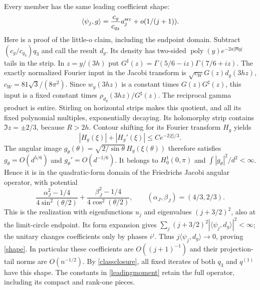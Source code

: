 Every member has the same leading coefficient shape:
\begin{equation}\label{shape}
 \langle\psi_j,g\rangle
   =\frac{c_g}{c_{q_3}}a_j^{\rm src}+o(1/(j+1)).
\end{equation}
Here is a proof of the little-o claim, including the endpoint domain.
Subtract $(c_g/c_{q_3})q_3$ and call the result $d_g$. Its density
has two-sided $\operatorname{poly}(y)e^{-2a|\Re y|}$ tails in the
strip. In $z=y/(3h)$ put
$G^\sharp(z)=\Gamma(5/6-iz)\Gamma(7/6+iz)$.
The exactly normalized Fourier input in the Jacobi transform is
$\sqrt{c_W}G(z)d_g(3hz)$, $c_W=81\sqrt3/(8\pi^2)$.
Since $w_y(3hz)$ is a constant times $G(z)G^\sharp(z)$, this input
is a fixed constant times $\rho_{d_g}(3hz)/G^\sharp(z)$.
The reciprocal gamma product is entire. Stirling on horizontal strips
makes this quotient, and all its fixed polynomial multiples, exponentially
decaying. Its holomorphy strip contains $\Im z=\pm2/3$, because
$R>2h$. Contour shifting for its Fourier transform $H_g$ yields
\[
 |H_g(\xi)|+|H_g'(\xi)|\le Ce^{-2|\xi|/3}.
\]
The angular image
$g_\theta(\theta)=\sqrt{2/\sin\theta}\,H_g(\xi(\theta))$
therefore satisfies
$g_\theta=O(d^{5/6})$ and $g_\theta'=O(d^{-1/6})$.
It belongs to $H_0^1(0,\pi)$ and
$\int |g_\theta|^2/d^2<\infty$. Hence it is in the quadratic-form
domain of the Friedrichs Jacobi angular operator, with potential
\[
 \frac{\alpha_J^2-1/4}{4\sin^2(\theta/2)}
 +\frac{\beta_J^2-1/4}{4\cos^2(\theta/2)},
 \qquad (\alpha_J,\beta_J)=(4/3,2/3).
\]
This is the realization with eigenfunctions $u_j$ and eigenvalues
$(j+3/2)^2$, also at the limit-circle endpoint.
Its form expansion gives
$\sum_j(j+3/2)^2|\langle\psi_j,d_g\rangle|^2<\infty$;
the unitary changes coefficients only by phases $i^j$.
Thus $j\langle\psi_j,d_g\rangle\to0$, proving \eqref{shape}.
In particular these coefficients are $O((j+1)^{-1})$ and their
projection-tail norms are $O(n^{-1/2})$.
By \eqref{classclosure}, all fixed iterates of both $q_3$ and
$q^{(1)}$ have this shape. The constants in \eqref{leadingmoment}
retain the full operator, including its compact and rank-one pieces.

